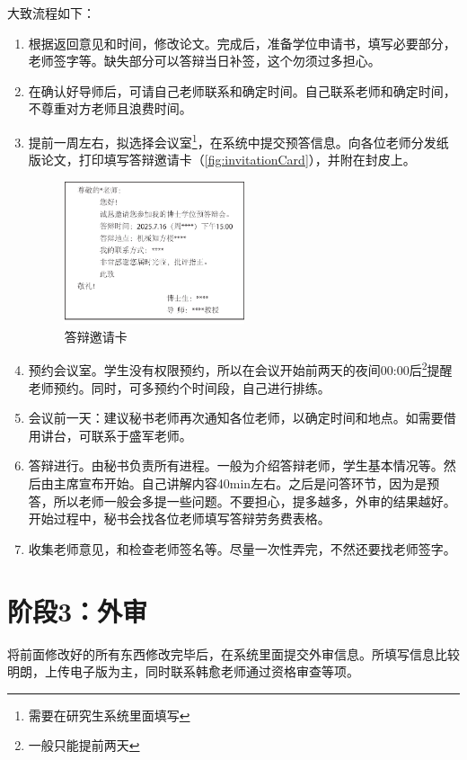 \documentclass[12pt,a4paper]{ctexart}
\begin{document}
大致流程如下：
\begin{enumerate}
\item 根据返回意见和时间，修改论文。完成后，准备学位申请书，填写必要部分，老师签字等。缺失部分可以答辩当日补签，这个勿须过多担心。
\item 在确认好导师后，可请自己老师联系和确定时间。自己联系老师和确定时间，不尊重对方老师且浪费时间。
\item 提前一周左右，拟选择会议室\footnote{需要在研究生系统里面填写}，在系统中提交预答信息。向各位老师分发纸版论文，打印填写答辩邀请卡（\autoref{fig:invitationCard}），并附在封皮上。
  \begin{figure}[H]
    \centering
    \includegraphics[width=0.5\textwidth]{images/invitationCard}  %
    \caption{答辩邀请卡}
    \label{fig:invitationCard}
  \end{figure}
\item 预约会议室。学生没有权限预约，所以在会议开始前两天的夜间00:00后\footnote{一般只能提前两天}提醒老师预约。同时，可多预约个时间段，自己进行排练。
\item 会议前一天：建议秘书老师再次通知各位老师，以确定时间和地点。如需要借用讲台，可联系于盛军老师。
\item 答辩进行。由秘书负责所有进程。一般为介绍答辩老师，学生基本情况等。然后由主席宣布开始。自己讲解内容40min左右。之后是问答环节，因为是预答，所以老师一般会多提一些问题。不要担心，提多越多，外审的结果越好。开始过程中，秘书会找各位老师填写答辩劳务费表格。
\item 收集老师意见，和检查老师签名等。尽量一次性弄完，不然还要找老师签字。
  \end{enumerate}

    
\section{阶段3：外审}
\label{sec:rev2}

将前面修改好的所有东西修改完毕后，在系统里面提交外审信息。所填写信息比较明朗，上传电子版为主，同时联系韩愈老师通过资格审查等项。
\end{document}
